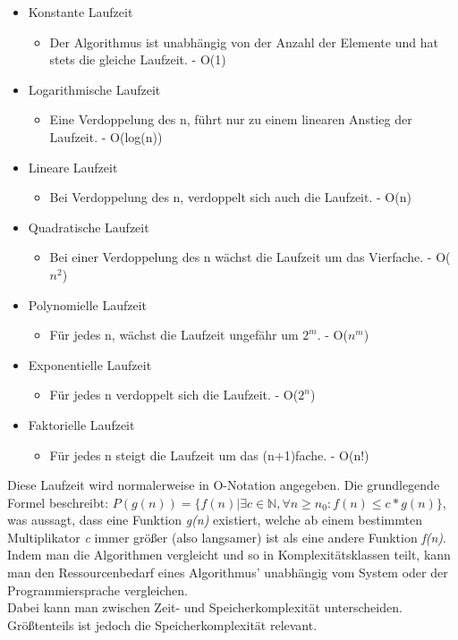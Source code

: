\documentclass{article}
\newcommand{\N}{\mathbb{N}}
\begin{document}
	\begin{itemize}
	 	\item{Konstante Laufzeit}
	 	\begin{itemize}
	 		\item{Der Algorithmus ist unabhängig von der Anzahl der Elemente und hat stets die gleiche Laufzeit. - O(1)}
	 	\end{itemize}
	 	\item{Logarithmische Laufzeit}
	 	\begin{itemize}
	 		\item{Eine Verdoppelung des n, führt nur zu einem linearen Anstieg der Laufzeit. - O(log(n))}
	 	\end{itemize}
	 	\item{Lineare Laufzeit}
	 	\begin{itemize}
	 		\item{Bei Verdoppelung des n, verdoppelt sich auch die Laufzeit. - O(n)}
	 	\end{itemize}
	 	\item{Quadratische Laufzeit}
	 	\begin{itemize}
	 		\item{Bei einer Verdoppelung des n wächst die Laufzeit um das Vierfache. - O($n^2$)}
	 	\end{itemize}
	 	\item{Polynomielle Laufzeit}
	 	\begin{itemize}
	 		\item{Für jedes n, wächst die Laufzeit ungefähr um $2^m$. - O($n^m$)}
	 	\end{itemize}
	 	\item{Exponentielle Laufzeit}
	 	\begin{itemize}
	 		\item{Für jedes n verdoppelt sich die Laufzeit. - O($2^n$)}
	 	\end{itemize}
	 	\item{Faktorielle Laufzeit}
	 	\begin{itemize}
	 		\item{Für jedes n steigt die Laufzeit um das (n+1)fache. - O(n!)}
	 	\end{itemize}
	 \end{itemize} 
	 Diese Laufzeit wird normalerweise in O-Notation angegeben. Die grundlegende Formel beschreibt: $P(g(n))=\{f(n)|\exists c\in \N, \forall n \geq n_0: f(n)\leq c*g(n)\}$, was aussagt, dass eine Funktion \textit{g(n)} existiert, welche ab einem bestimmten Multiplikator \textit{c} immer größer (also langsamer) ist als eine andere Funktion \textit{f(n)}. \\
	 Indem man die Algorithmen vergleicht und so in Komplexitätsklassen teilt, kann man den Ressourcenbedarf eines Algorithmus' unabhängig vom System oder der Programmiersprache vergleichen. \\
	 Dabei kann man zwischen Zeit- und Speicherkomplexität unterscheiden. Größtenteils ist jedoch die Speicherkomplexität relevant. \\
\end{document}
